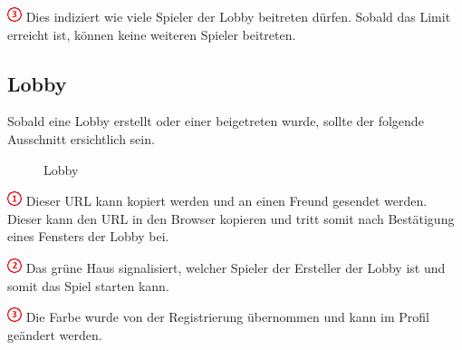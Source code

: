 \documentclass[11pt,ngerman]{article}
\begin{document}
    \includegraphics{figures/3.png} Dies indiziert wie viele Spieler der Lobby beitreten dürfen. Sobald das Limit erreicht ist, können keine weiteren Spieler beitreten.
    
	\subsection{Lobby}
	
	Sobald eine Lobby erstellt oder einer beigetreten wurde, sollte der folgende Ausschnitt ersichtlich sein.
    \begin{figure}[H]
    	\centering
    	\caption{Lobby}
    	\label{fig:Lobby}
    \end{figure}
  
    
    \includegraphics{figures/1.png} Dieser URL kann kopiert werden und an einen Freund gesendet werden. Dieser kann den URL in den Browser kopieren und tritt somit nach Bestätigung eines Fensters der Lobby bei.
    
    \includegraphics{figures/2.png} Das grüne Haus signalisiert, welcher Spieler der Ersteller der Lobby ist und somit das Spiel starten kann.
    
    \includegraphics{figures/3.png} Die Farbe wurde von der Registrierung übernommen und kann im Profil geändert werden.
    
\end{document}
